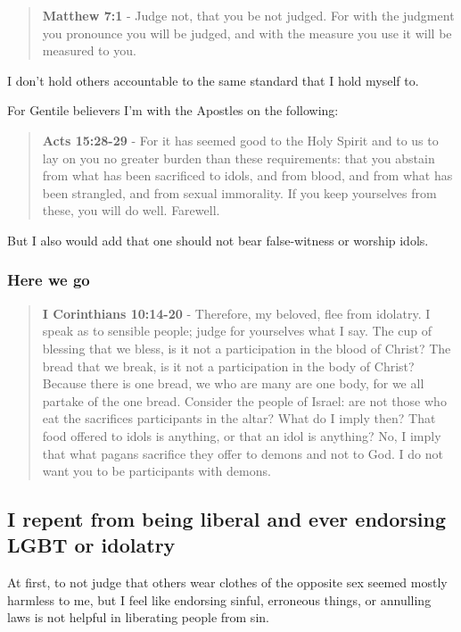 \documentclass[11pt]{article}
\begin{document}
\begin{quote}
\textbf{Matthew 7:1} - Judge not, that you be not judged.  For with the judgment you pronounce you will be judged, and with the measure you use it will be measured to you.
\end{quote}

I don't hold others accountable to the same standard that I hold myself to.

For Gentile believers I'm with the Apostles on the following:

\begin{quote}
\textbf{Acts 15:28-29} - For it has seemed good to the Holy Spirit and to us to lay on you no greater burden than these requirements: that you abstain from what has been sacrificed to idols, and from blood, and from what has been strangled, and from sexual immorality. If you keep yourselves from these, you will do well. Farewell.
\end{quote}

But I also would add that one should not bear false-witness or worship idols.

\subsubsection{Here we go}
\label{sec:org4c3161c}
\begin{quote}
\textbf{I Corinthians 10:14-20} - Therefore, my beloved, flee from idolatry.  I speak as to sensible people; judge for yourselves what I say.  The cup of blessing that we bless, is it not a participation in the blood of Christ? The bread that we break, is it not a participation in the body of Christ?  Because there is one bread, we who are many are one body, for we all partake of the one bread.  Consider the people of Israel: are not those who eat the sacrifices participants in the altar?  What do I imply then? That food offered to idols is anything, or that an idol is anything?  No, I imply that what pagans sacrifice they offer to demons and not to God. I do not want you to be participants with demons.
\end{quote}

\subsection{I repent from being liberal and ever endorsing LGBT or idolatry}
\label{sec:orgeca2491}
At first, to not judge that others wear
clothes of the opposite sex seemed mostly
harmless to me, but I feel like endorsing
sinful, erroneous things, or annulling laws
is not helpful in liberating people from sin.
\end{document}
